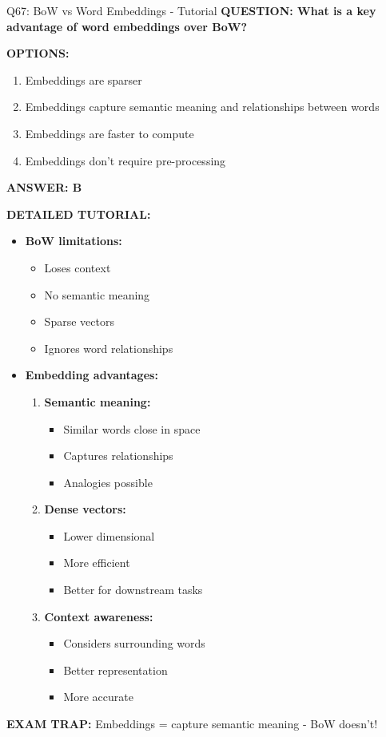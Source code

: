 \documentclass[8pt]{beamer}
\begin{document}
	\begin{frame}{Q67: BoW vs Word Embeddings - Tutorial}
		\fontsize{6.5}{7.5}\selectfont
		\textbf{QUESTION: What is a key advantage of word embeddings over BoW?}
		
		\vspace{0.1cm}
		\textbf{OPTIONS:}
		\begin{enumerate}
			\item Embeddings are sparser
			\item Embeddings capture semantic meaning and relationships between words
			\item Embeddings are faster to compute
			\item Embeddings don't require pre-processing
		\end{enumerate}
		
		\vspace{0.1cm}
		\textcolor{myblue}{\textbf{ANSWER: B}}
		
		\vspace{0.1cm}
		\textbf{DETAILED TUTORIAL:}
		\begin{itemize}
			\item \textbf{BoW limitations:}
			\begin{itemize}
				\item Loses context
				\item No semantic meaning
				\item Sparse vectors
				\item Ignores word relationships
			\end{itemize}
			\item \textbf{Embedding advantages:}
			\begin{enumerate}
				\item \textbf{Semantic meaning:}
				\begin{itemize}
					\item Similar words close in space
					\item Captures relationships
					\item Analogies possible
				\end{itemize}
				\item \textbf{Dense vectors:}
				\begin{itemize}
					\item Lower dimensional
					\item More efficient
					\item Better for downstream tasks
				\end{itemize}
				\item \textbf{Context awareness:}
				\begin{itemize}
					\item Considers surrounding words
					\item Better representation
					\item More accurate
				\end{itemize}
			\end{enumerate}
		\end{itemize}
		
		\textcolor{myred}{\textbf{EXAM TRAP:}} Embeddings = \textcolor{myblue}{capture semantic meaning} - BoW doesn't!
	\end{frame}
	
\end{document}
